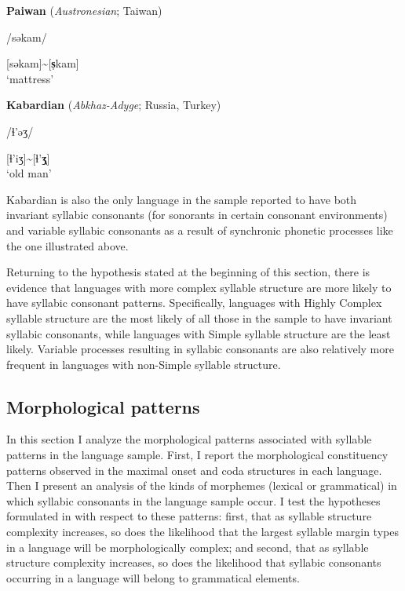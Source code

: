 \ea\label{ex:3.19}
  \textbf{Paiwan} (\textit{Austronesian}; Taiwan)

/səkam/

[səkam]{\textasciitilde}[\textbf{s̩}kam]\\
\glt ‘mattress’
\citep[41]{Chang2006}
\z

\ea\label{ex:3.20}
  \textbf{Kabardian} (\textit{Abkhaz-Adyge}; Russia, Turkey)

/ɬ{}'əʒ/

[ɬ’iʒ]{\textasciitilde}[ɬ{}'\textbf{ʒ̩}]\\
\glt ‘old man’
\citep[24]{Kuipers1960}
\z

Kabardian is also the only language in the sample reported to have both invariant syllabic consonants (for sonorants in certain consonant environments) and variable syllabic consonants as a result of synchronic phonetic processes like the one illustrated above.

  Returning to the hypothesis stated at the beginning of this section, there is evidence that languages with more complex syllable structure are more likely to have syllabic consonant patterns. Specifically, languages with Highly Complex syllable structure are the most likely of all those in the sample to have invariant syllabic consonants, while languages with Simple syllable structure are the least likely. Variable processes resulting in syllabic consonants are also relatively more frequent in languages with non-Simple syllable structure.

\subsection{Morphological patterns}\label{sec:3.3.6}

  In this section I analyze the morphological patterns associated with syllable patterns in the language sample. First, I report the morphological constituency patterns observed in the maximal onset and coda structures in each language. Then I present an analysis of the kinds of morphemes (lexical or grammatical) in which syllabic consonants in the language sample occur. I test the hypotheses formulated in  with respect to these patterns: first, that as syllable structure complexity increases, so does the likelihood that the largest syllable margin types in a language will be morphologically complex; and second, that as syllable structure complexity increases, so does the likelihood that syllabic consonants occurring in a language will belong to grammatical elements.

